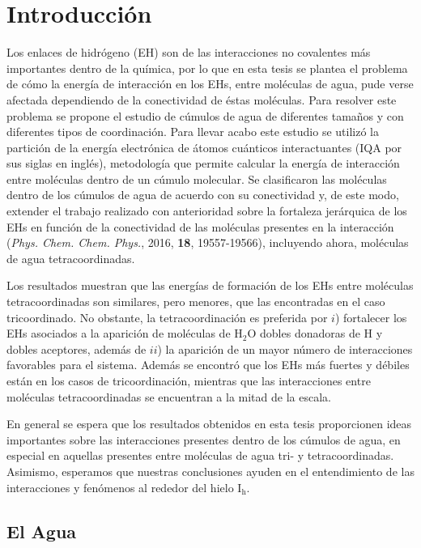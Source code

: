 \chapter{Introducción}

Los enlaces de hidrógeno (EH) son de las interacciones no covalentes más
importantes dentro de la química, por lo que en esta tesis se plantea el
problema de cómo la energía de interacción en los EHs, entre moléculas de agua,
pude verse afectada dependiendo de la conectividad de éstas moléculas. Para
resolver este problema se propone el estudio de cúmulos de agua de diferentes
tamaños y con diferentes tipos de coordinación.  Para llevar acabo este estudio
se utilizó la partición de la energía electrónica de átomos cuánticos
interactuantes (IQA por sus siglas en inglés), metodología que permite calcular
la energía de interacción entre moléculas dentro de un cúmulo molecular. Se
clasificaron las moléculas dentro de los cúmulos de agua de acuerdo con su
conectividad y, de este modo, extender el trabajo realizado con anterioridad
sobre la fortaleza jerárquica de los EHs en función de la conectividad de las
moléculas presentes en la interacción (\textit{Phys. Chem. Chem. Phys.}, 2016,
\textbf{18}, 19557-19566), incluyendo ahora, moléculas de agua
tetracoordinadas.

Los resultados muestran que las energías de formación de los EHs entre
moléculas tetracoordinadas son similares, pero menores, que las encontradas en
el caso tricoordinado. No obstante, la tetracoordinación es preferida por $i$)
fortalecer los EHs asociados a la aparición de moléculas de H$_2$O dobles
donadoras de H y dobles aceptores, además de $ii$) la aparición de un mayor
número de interacciones favorables para el sistema. Además se encontró que los
EHs más fuertes y débiles están en los casos de tricoordinación, mientras que
las interacciones entre moléculas tetracoordinadas se encuentran a la mitad de
la escala.

En general se espera que los resultados obtenidos en esta tesis proporcionen
ideas importantes sobre las interacciones presentes dentro de los cúmulos de
agua, en especial en aquellas presentes entre moléculas de agua tri- y
tetracoordinadas. Asimismo, esperamos que nuestras conclusiones ayuden en el
entendimiento de las interacciones y fenómenos al rededor del hielo
$\mathrm{I_{h}}$.

\section{El Agua}

